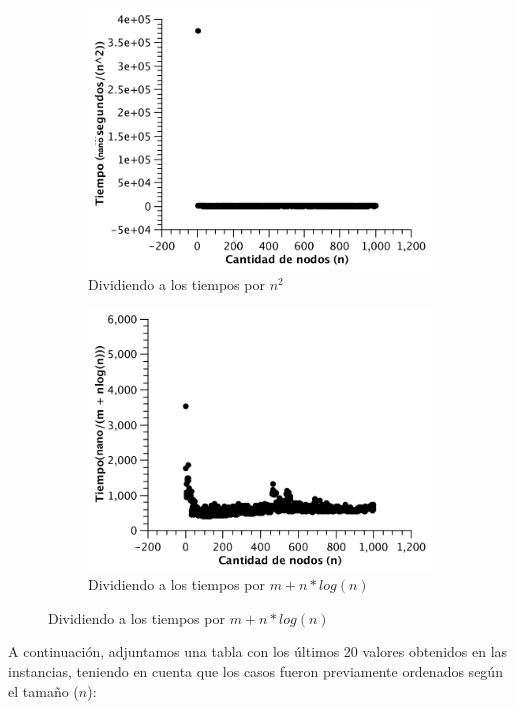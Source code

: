 \begin{figure}[H]
        \centering
         \begin{subfigure}[b]{0.45\textwidth}
                \includegraphics[width=\textwidth]{imagenes/completo-listas-3.pdf}
                \caption{Dividiendo a los tiempos por $n^2$}
        \end{subfigure}
        \begin{subfigure}[b]{0.45\textwidth}
                \includegraphics[width=\textwidth]{imagenes/completo-listas-4.pdf}
                \caption{Dividiendo a los tiempos por $m + n*log(n)$}
        \end{subfigure}
\end{figure}
A continuación, adjuntamos una tabla con los últimos 20 valores obtenidos en las instancias, teniendo en cuenta que los casos fueron previamente ordenados según el tamaño ($n$):

